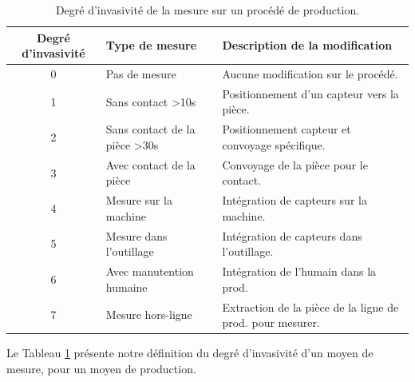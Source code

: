 \begin{table}[tbp]
	\hspace*{-5mm}
	\begin{tabular}{|c|l|l|}
		\arrayrulecolor{black}
		\hline
		Degré d'invasivité & Type de mesure & Description de la modification \\
		\hline \hline
		0 & Pas de mesure & Aucune modification sur le procédé. \\ \hline
		1 & Sans contact >10s & Positionnement d'un capteur vers la pièce. \\ \hline
		2 & Sans contact de la pièce >30s & Positionnement capteur et convoyage spécifique. \\ \hline
		3 & Avec contact de la pièce & Convoyage de la pièce pour le contact. \\ \hline
		4 & Mesure sur la machine & Intégration de capteurs sur la machine.  \\ \hline
		5 & Mesure dans l'outillage & Intégration de capteurs dans l'outillage. \\ \hline
		6 & Avec manutention humaine & Intégration de l'humain dans la prod. \\ \hline
		7 & Mesure hors-ligne & Extraction de la pièce de la ligne de prod. pour mesurer. \\ \hline
	\end{tabular}
	\caption{Degré d'invasivité de la mesure sur un procédé de production.}
	\label{tab:measure_invasivity}
\end{table}

\noindent
Le Tableau \ref{tab:measure_invasivity} présente notre définition du degré d'invasivité d'un moyen de mesure, pour un moyen de production.

